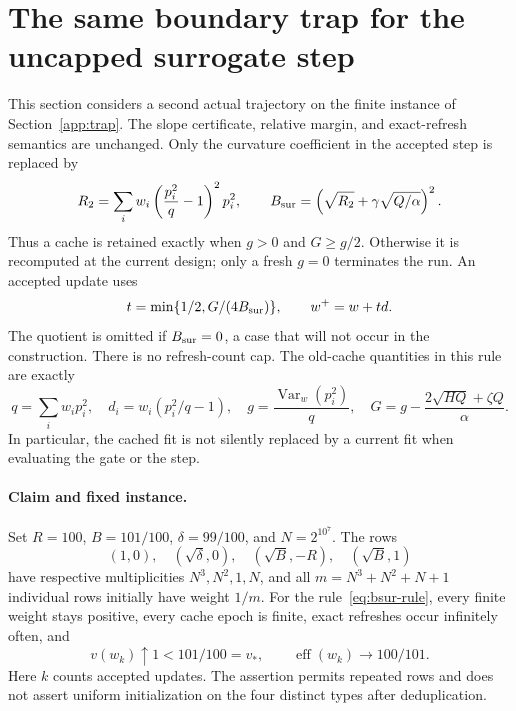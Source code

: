 \section{The same boundary trap for the uncapped surrogate step}
\label{app:bsur-trap}

This section considers a second actual trajectory on the finite instance of
Section~\ref{app:trap}. The slope certificate, relative margin, and exact-refresh
semantics are unchanged. Only the curvature coefficient in the accepted step is
replaced by
\[
 R_2=\sum_iw_i\left(\frac{p_i^2}{q}-1\right)^2p_i^2,
 \qquad B_{\rm sur}=\left(\sqrt{R_2}
                  +\gamma\sqrt{Q/\alpha}\right)^2.
\]
Thus a cache is retained exactly when $g>0$ and $G\ge g/2$. Otherwise it is
recomputed at the current design; only a fresh $g=0$ terminates the run. An
accepted update uses
\begin{equation}\label{eq:bsur-rule}
 t=\min\{1/2,G/(4B_{\rm sur})\},\qquad w^+=w+td.
\end{equation}
The quotient is omitted if $B_{\rm sur}=0$, a case that will not occur in the
construction. There is no refresh-count cap. The old-cache quantities in this
rule are exactly
\[
 q=\sum_iw_ip_i^2,\quad d_i=w_i(p_i^2/q-1),\quad
 g=\frac{\operatorname{Var}_w(p_i^2)}q,\quad
 G=g-\frac{2\sqrt{HQ}+\zeta Q}{\alpha}.
\]
In particular, the cached fit is not silently replaced by a current fit when
evaluating the gate or the step.

\paragraph{Claim and fixed instance.}
Set $R=100$, $B=101/100$, $\delta=99/100$, and $N=2^{10^7}$. The rows
\[
 (1,0),\quad(\sqrt\delta,0),\quad
 (\sqrt B,-R),\quad(\sqrt B,1)
\]
have respective multiplicities $N^3,N^2,1,N$, and all
$m=N^3+N^2+N+1$ individual rows initially have weight $1/m$.
For the rule~\eqref{eq:bsur-rule}, every finite weight stays positive, every cache
epoch is finite, exact refreshes occur infinitely often, and
\begin{equation}\label{eq:bsur-claim}
 v(w_k)\uparrow1<101/100=v_*,\qquad
 \operatorname{eff}(w_k)\longrightarrow100/101.
\end{equation}
Here $k$ counts accepted updates. The assertion permits repeated rows and does
not assert uniform initialization on the four distinct types after deduplication.

